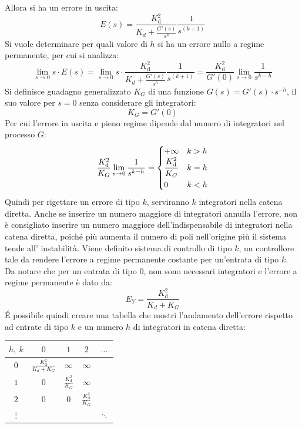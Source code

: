 \documentclass{article}
\numberwithin{equation}{subsection}
\newcommand{\df}{\mathrm{d}}
\newcommand{\Frac}[2]{\displaystyle\frac{\strut{#1}}{\strut{#2}}}
\begin{document}
Allora si ha un errore in uscita:
\begin{equation}
    E(s)=\displaystyle\frac{K_\df^2}{K_d+\displaystyle\frac{G'(s)}{s^h}}\frac{1}{s^{(k+1)}}
\end{equation}
Si vuole determinare per quali valore di $h$ si ha un errore nullo a regime permanente, per cui si analizza: 
\begin{equation*}
    \lim_{s\to0}s\cdot E(s)=\lim_{s\to0}s\cdot\displaystyle\frac{K_\df^2}{K_d+\displaystyle\frac{G'(s)}{s^h}}\frac{1}{s^{(k+1)}}=\frac{K_\df^2}{G'(0)}\lim_{s\to0}\frac{1}{s^{k-h}}
\end{equation*}
Si definisce guadagno generalizzato $K_G$ di una funzione $G(s)={G'(s)}\cdot{s^{-h}}$, il suo valore per $s=0$ senza considerare gli integratori: 
\begin{equation*}
    K_G=G'(0)
\end{equation*}
Per cui l'errore in uscita e pieno regime dipende dal numero di integratori nel processo $G$:
\begin{equation}
    \displaystyle\frac{K_\df^2}{K_G}\lim_{s\to0}\frac{1}{s^{k-h}}=
    \begin{cases}
        +\infty &k>h\\
        \displaystyle\Frac{K_\df^2}{K_G} &k=h\\
        0 &k<h
    \end{cases}
\end{equation}
Quindi per rigettare un errore di tipo $k$, serviranno $k$ integratori nella catena diretta. Anche se inserire un numero maggiore di integratori annulla l'errore, non è 
consigliato inserire un numero maggiore dell'indispensabile di integratori nella catena diretta, poiché più aumenta il numero di poli nell'origine più il sistema tende all'
instabilità. Viene definito sistema di controllo di tipo $k$, un controllore tale da rendere l'errore a regime permanente costante per un'entrata di tipo $k$. Da notare che 
per un entrata di tipo $0$, non sono necessari integratori e l'errore a regime permanente è dato da: 
\begin{equation*}
    E_Y=\displaystyle\frac{K_\df^2}{K_d+K_G}
\end{equation*}
\'{E} possibile quindi creare una tabella che mostri l'andamento dell'errore rispetto ad entrate di tipo $k$ e un numero $h$ di integratori in catena diretta:

\begin{center}
    \begin{tabular}{|c|c|c|c|c}
        \hline
        $h,\:k$ & $0$ & $1$ & $2$ & $\ldots$\\[0.5ex]
        \hline
        $0$ & $\displaystyle\frac{K_\df^2}{K_d+K_G}$ & $\infty$ &$\infty$\\[0.5ex]
        \hline
        $1$ & $0$ & $\displaystyle\frac{K_\df^2}{K_G}$ & $\infty$\\[0.5ex]
        \hline
        $2$ & $0$ & $0$ & $\displaystyle\frac{K_\df^2}{K_G}$\\[0.5ex]
        \hline
        $\vdots$ & & & & $\ddots$\\
    \end{tabular}
\end{center}
\end{document}
